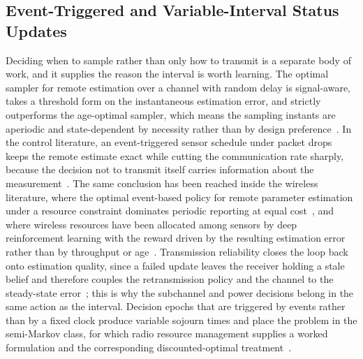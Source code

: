 \documentclass[journal]{IEEEtran}
\begin{document}
\subsection{Event-Triggered and Variable-Interval Status Updates}
Deciding when to sample rather than only how to transmit is a separate body of work, and it supplies the reason the interval is worth learning. The optimal sampler for remote estimation over a channel with random delay is signal-aware, takes a threshold form on the instantaneous estimation error, and strictly outperforms the age-optimal sampler, which means the sampling instants are aperiodic and state-dependent by necessity rather than by design preference~\cite{sun2020}. In the control literature, an event-triggered sensor schedule under packet drops keeps the remote estimate exact while cutting the communication rate sharply, because the decision not to transmit itself carries information about the measurement~\cite{xu2020}. The same conclusion has been reached inside the wireless literature, where the optimal event-based policy for remote parameter estimation under a resource constraint dominates periodic reporting at equal cost~\cite{flanigan2022}, and where wireless resources have been allocated among sensors by deep reinforcement learning with the reward driven by the resulting estimation error rather than by throughput or age~\cite{pang2023}. Transmission reliability closes the loop back onto estimation quality, since a failed update leaves the receiver holding a stale belief and therefore couples the retransmission policy and the channel to the steady-state error~\cite{huang2020}; this is why the subchannel and power decisions belong in the same action as the interval. Decision epochs that are triggered by events rather than by a fixed clock produce variable sojourn times and place the problem in the semi-Markov class, for which radio resource management supplies a worked formulation and the corresponding discounted-optimal treatment~\cite{perezromero2020}.
\end{document}
